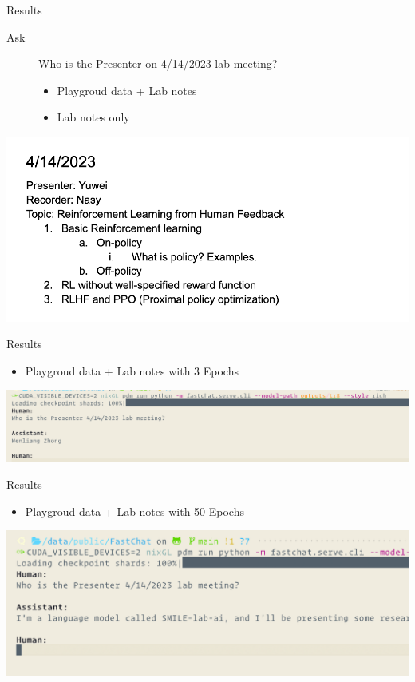 \documentclass[aspectratio=1610,xcolor={dvipsnames},hyperref={colorlinks,unicode,linkcolor=violet,anchorcolor=BlueViolet,citecolor=YellowOrange,filecolor=black,urlcolor=Aquamarine}]{beamer}
\begin{document}
\begin{frame}[label={sec:orga2c4bc0}]{Results}
\begin{description}
\item[{Ask}] Who is the Presenter on 4/14/2023 lab meeting?
\begin{itemize}
\item Playgroud data + Lab notes
\item Lab notes only
\end{itemize}
\end{description}

\begin{center}
\includegraphics[width=.9\linewidth]{./p6.png}
\end{center}
\end{frame}

\begin{frame}[label={sec:orgba4f7ad}]{Results}
\begin{itemize}
\item Playgroud data + Lab notes with 3 Epochs
\end{itemize}

\begin{center}
\includegraphics[width=.9\linewidth]{./p7.png}
\end{center}
\end{frame}

\begin{frame}[label={sec:orgd5c6734}]{Results}
\begin{itemize}
\item Playgroud data + Lab notes with 50 Epochs
\end{itemize}

\begin{center}
\includegraphics[width=.9\linewidth]{./p8.png}
\end{center}
\end{frame}
\end{document}
